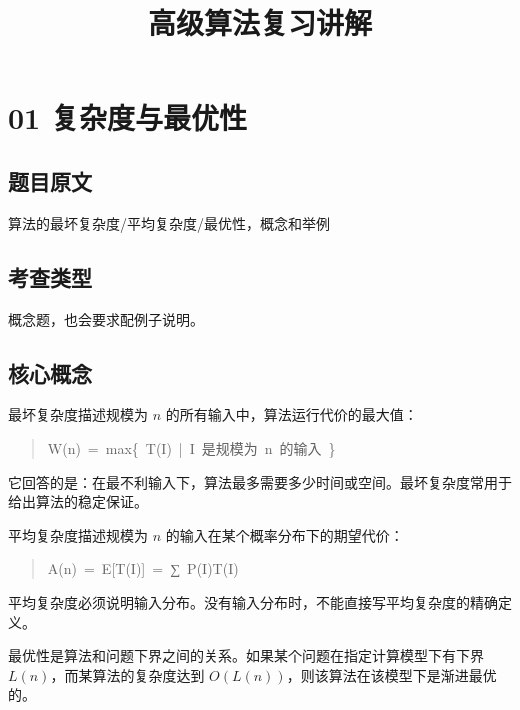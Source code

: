 \documentclass[UTF8,zihao=-4]{ctexart}
\title{高级算法复习讲解}
\author{}
\date{}
\begin{document}
\maketitle

\tableofcontents

\newpage

\section*{01 复杂度与最优性}

\subsection*{题目原文}

算法的最坏复杂度/平均复杂度/最优性，概念和举例

\subsection*{考查类型}

概念题，也会要求配例子说明。

\subsection*{核心概念}

最坏复杂度描述规模为 $n$ 的所有输入中，算法运行代价的最大值：

\begin{quote}
\small\ttfamily\raggedright
\relax W(n)\ =\ max\{\ T(I)\ |\ I\ 是规模为\ n\ 的输入\ \}\\
\end{quote}

它回答的是：在最不利输入下，算法最多需要多少时间或空间。最坏复杂度常用于给出算法的稳定保证。

平均复杂度描述规模为 $n$ 的输入在某个概率分布下的期望代价：

\begin{quote}
\small\ttfamily\raggedright
\relax A(n)\ =\ E[T(I)]\ =\ ∑\ P(I)T(I)\\
\end{quote}

平均复杂度必须说明输入分布。没有输入分布时，不能直接写平均复杂度的精确定义。

最优性是算法和问题下界之间的关系。如果某个问题在指定计算模型下有下界 $L(n)$，而某算法的复杂度达到 $O(L(n))$，则该算法在该模型下是渐进最优的。
\end{document}

